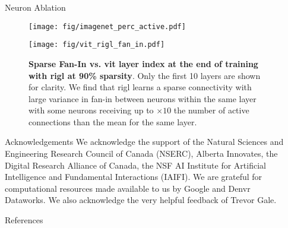 \documentclass[final]{beamer}
\newlength{\sepwidth}
\newlength{\colwidth}
\newcommand{\separatorcolumn}{\begin{column}{\sepwidth}\end{column}}
\begin{document}
\begin{frame}[t]
\begin{columns}[t]
\begin{column}{\colwidth}
\begin{block}{Neuron Ablation}
\begin{figure}
    \begin{minipage}[t]{.48\colwidth}
        \texttt{[image: fig/imagenet\_perc\_active.pdf]}
        \caption{Neuron Ablation}\label{fig:imagenet_perc_active}
    \end{minipage}
    \hfill
    \begin{minipage}[t]{.48\colwidth}
        \texttt{[image: fig/vit\_rigl\_fan\_in.pdf]}
        \caption{\textbf{Sparse Fan-In vs. \gls{vit} layer index at the end of training with \gls{rigl} at 90\% sparsity}. Only the first 10 layers are shown for clarity. We find that \gls{rigl} learns a sparse connectivity with large variance in fan-in between neurons within the same layer with some neurons receiving up to $\times 10$ the number of active connections than the mean for the same layer.}\label{fig:vit-rigl-fan-in}
    \end{minipage}
\end{figure}


  \end{block}

  \begin{block}{Acknowledgements}
  We acknowledge the support of the Natural Sciences and Engineering Research Council of Canada (NSERC), Alberta Innovates, the Digital Research Alliance of Canada, the NSF AI Institute for Artificial Intelligence and Fundamental Interactions (IAIFI). We are grateful for computational resources made available to us by Google and Denvr Dataworks. We also acknowledge the very helpful feedback of Trevor Gale. 

  \end{block}

  \begin{block}{References}

    \footnotesize{}

  \end{block}

\end{column}

\separatorcolumn
\end{columns}
\end{frame}
\end{document}
